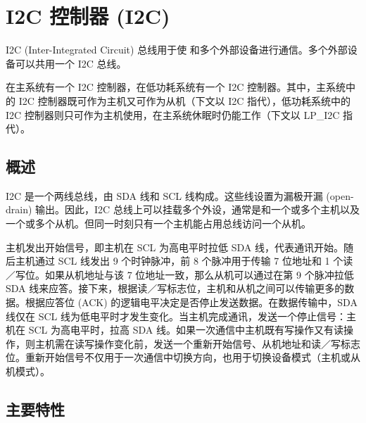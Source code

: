 \documentclass[main\_\_CN.tex]{subfiles}
\begin{document}

\ifglobal
\else
    \listoftodos
    {\let\clearpage\relax \listofdonetodos}
    \tableofcontents
\fi



\hypertarget{i2c}{}
\chapter{I2C 控制器 (I2C)}
\label{mod:i2c}

I2C (Inter-Integrated Circuit) 总线用于使 \chipname{} 和多个外部设备进行通信。多个外部设备可以共用一个 I2C 总线。

\chipname{} 在主系统有一个 I2C 控制器，在低功耗系统有一个 I2C 控制器。其中，主系统中的 I2C 控制器既可作为主机又可作为从机（下文以 I2C 指代），低功耗系统中的 I2C 控制器则只可作为主机使用，在主系统休眠时仍能工作（下文以 LP\_I2C 指代）。

\section{概述}

I2C 是一个两线总线，由 SDA 线和 SCL 线构成。这些线设置为漏极开漏 (open-drain) 输出。因此，I2C 总线上可以挂载多个外设，通常是和一个或多个主机以及一个或多个从机。但同一时刻只有一个主机能占用总线访问一个从机。

主机发出开始信号，即主机在 SCL 为高电平时拉低 SDA 线，代表通讯开始。随后主机通过 SCL 线发出 9 个时钟脉冲，前 8 个脉冲用于传输 7 位地址和 1 个读／写位。如果从机地址与该 7 位地址一致，那么从机可以通过在第 9 个脉冲拉低 SDA 线来应答。接下来，根据读／写标志位，主机和从机之间可以传输更多的数据。根据应答位 (ACK) 的逻辑电平决定是否停止发送数据。在数据传输中，SDA 线仅在 SCL 线为低电平时才发生变化。当主机完成通讯，发送一个停止信号：主机在 SCL 为高电平时，拉高 SDA 线。如果一次通信中主机既有写操作又有读操作，则主机需在读写操作变化前，发送一个重新开始信号、从机地址和读／写标志位。重新开始信号不仅用于一次通信中切换方向，也用于切换设备模式（主机或从机模式）。

\section{主要特性}
\end{document}
